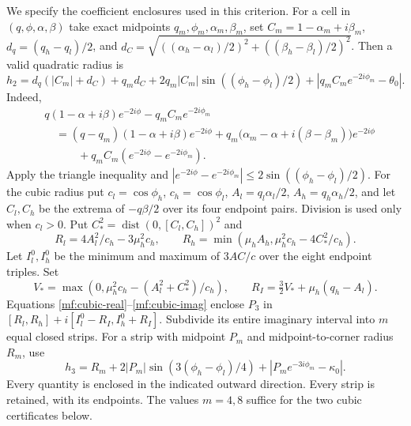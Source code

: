 \documentclass[11pt,reqno]{amsart}
\numberwithin{equation}{section}
\theoremstyle{definition}
\theoremstyle{remark}
\begin{document}
We specify the coefficient enclosures used in this criterion.
For a cell in $(q,\phi,\alpha,\beta)$ take exact midpoints
$q_m,\phi_m,\alpha_m,\beta_m$, set
$C_m=1-\alpha_m+i\beta_m$,
$d_q=(q_h-q_l)/2$, and
$d_C=\sqrt{((\alpha_h-\alpha_l)/2)^2+
                ((\beta_h-\beta_l)/2)^2}$.
Then a valid quadratic radius is
\[
 h_2=d_q(|C_m|+d_C)+q_md_C
       +2q_m|C_m|\sin((\phi_h-\phi_l)/2)
       +|q_mC_me^{-2i\phi_m}-\theta_0|.
\]
Indeed,
\begin{align*}
 &q(1-\alpha+i\beta)e^{-2i\phi}-q_mC_me^{-2i\phi_m}\\
 &\quad=(q-q_m)(1-\alpha+i\beta)e^{-2i\phi}
       +q_m\bigl(\alpha_m-\alpha+i(\beta-\beta_m)\bigr)e^{-2i\phi}\\
 &\qquad\quad+q_mC_m(e^{-2i\phi}-e^{-2i\phi_m}).
\end{align*}
Apply the triangle inequality and
$|e^{-2i\phi}-e^{-2i\phi_m}|
 \le2\sin((\phi_h-\phi_l)/2)$.
For the cubic radius put $c_l=\cos\phi_h$, $c_h=\cos\phi_l$,
$A_l=q_l\alpha_l/2$, $A_h=q_h\alpha_h/2$, and let $C_l,C_h$
be the extrema of $-q\beta/2$ over its four endpoint pairs.
Division is used only when $c_l>0$. Put
$C_*^2=\operatorname{dist}(0,[C_l,C_h])^2$ and
\[
 R_l=4A_l^2/c_h-3\mu_h^2c_h,\qquad
 R_h=\min(\mu_hA_h,\mu_h^2c_h-4C_*^2/c_h).
\]
Let $I_l^0,I_h^0$ be the minimum and maximum of $3AC/c$
over the eight endpoint triples. Set
\[
 V_*=\max(0,\mu_h^2c_h-(A_l^2+C_*^2)/c_h),\qquad
 R_I=\tfrac32V_*+\mu_h(q_h-A_l).
\]
Equations \eqref{mf:cubic-real}--\eqref{mf:cubic-imag} enclose
$P_3$ in $[R_l,R_h]+i[I_l^0-R_I,I_h^0+R_I]$.
Subdivide its entire imaginary interval into $m$ equal closed
strips. For a strip with midpoint $P_m$ and midpoint-to-corner
radius $R_m$, use
\[
 h_3=R_m+2|P_m|\sin(3(\phi_h-\phi_l)/4)
                 +|P_me^{-3i\phi_m}-\kappa_0|.
\]
Every quantity is enclosed in the indicated outward direction.
Every strip is retained, with its endpoints. The values
$m=4,8$ suffice for the two cubic certificates below.
\end{document}
